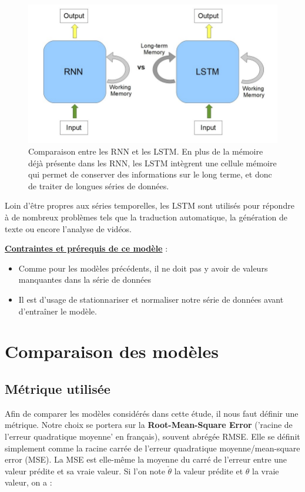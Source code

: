 \documentclass[french]{article}
\begin{document}
    
    \begin{figure}[h!]
        \includegraphics[width=12cm]{RNNvsLSTM}
        \centering
        \caption{Comparaison entre les RNN et les LSTM. En plus de la mémoire déjà présente dans les RNN, les LSTM intègrent une cellule mémoire qui permet de conserver des informations sur le long terme, et donc de traiter de longues séries de données.}
        \centering
    \end{figure}

    Loin d'être propres aux séries temporelles, les LSTM sont utilisés pour répondre à de nombreux problèmes tels que la traduction automatique, la génération de texte ou encore l'analyse de vidéos.

    \underline{\textbf{Contraintes et prérequis de ce modèle}} : 
    \begin{itemize}
        \item Comme pour les modèles précédents, il ne doit pas y avoir de valeurs manquantes dans la série de données
        \item Il est d'usage de stationnariser et normaliser notre série de données avant d'entraîner le modèle.
    \end{itemize}

    \section{Comparaison des modèles}

    \subsection{Métrique utilisée}
    
    Afin de comparer les modèles considérés dans cette étude, il nous faut définir une métrique. Notre choix se portera sur la \textbf{Root-Mean-Square Error} ('racine de l'erreur quadratique moyenne' en français), souvent abrégée RMSE. Elle se définit simplement comme la racine carrée de l'erreur quadratique moyenne/mean-square error (MSE). La MSE est elle-même la moyenne du carré de l'erreur entre une valeur prédite et sa vraie valeur. Si l'on note $\check{\theta}$ la valeur prédite et $\theta$ la vraie valeur, on a :
    
\end{document}
